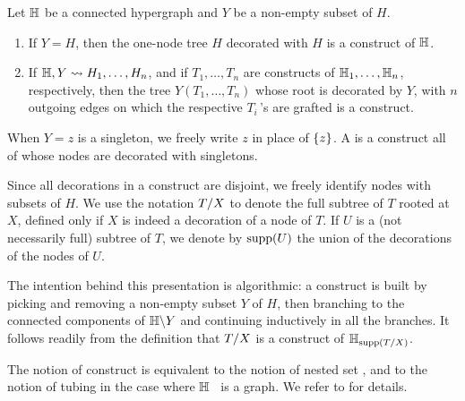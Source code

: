 \begin{definition} 
\label{inductive-construct}
Let ${\mathbb H}$ be a connected hypergraph and $Y$ be a non-empty subset of $H$.
\begin{enumerate}
\item  If $Y = H$, then the one-node tree $H$ decorated with $H$ is a construct of ${\mathbb H}$.
\item If ${\mathbb H},Y  \leadsto H_1,\ldots,H_n$, and if $T_1,\ldots,T_n$ are constructs of ${\mathbb H}_1,\ldots,{\mathbb H}_n$, respectively, then the
tree $Y(T_1,\ldots,T_n)$ whose root is decorated by $Y$, with $n$ outgoing edges on which the respective $T_i\,$'s are grafted is a construct.  
\end{enumerate}
When $Y={z}$ is a singleton, we freely write $z$ in place of $\left\{z\right\}$.
A  is a construct all of whose nodes are  decorated with singletons. 
\end{definition}

Since all decorations in a construct are disjoint, we freely identify nodes with subsets of $H$. 
We use the notation $T/X$ to denote the full subtree of $T$ rooted at $X$, defined only if $X$ is indeed a decoration of a node of $T$. 
If $U$ is a (not necessarily full) subtree of $T$, we denote by $\operatorname{supp}(U)$ the union of the decorations of the nodes of $U$.

\begin{rem} \label{subconstruct-restriction}
The intention behind this presentation is algorithmic: a construct is built by picking and removing a non-empty subset $Y$ of $H$, then branching to the connected components of ${\mathbb H}\backslash Y$ and continuing inductively in all the branches.
It follows readily from the definition that $T/X$ is a construct of ${\mathbb H}_{\operatorname{supp}(T/X)}$.
\end{rem}

\begin{rem}
    The notion of construct is equivalent to the notion of nested set \cite{P09}, and to the notion of tubing in the case where ${\mathbb H}$~\cite{CD-CCGA} is a graph.  
    We refer to \cite[Sec.~3.1]{COI} for details.
\end{rem}


